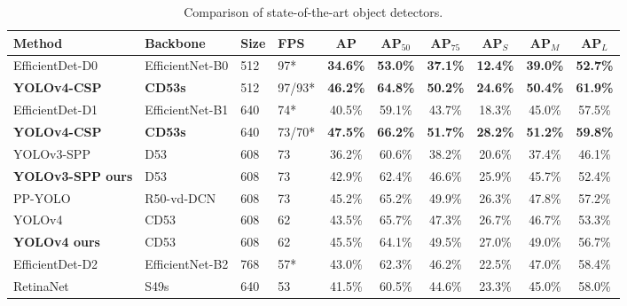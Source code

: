 \documentclass[10pt,twocolumn,letterpaper]{article}
\begin{document}
\begin{table*}[h]
\centering
\begin{threeparttable}[h]
	\footnotesize
	\caption{Comparison of state-of-the-art object detectors.}
	\label{table:t12}
\begin{tabular}{llllcccccc}
		\toprule
		\textbf{Method} & \textbf{Backbone} & \textbf{Size} & \textbf{FPS} & \textbf{AP} & \textbf{AP$_{50}$} & \textbf{AP$_{75}$} & \textbf{AP$_S$} & \textbf{AP$_M$} & \textbf{AP$_L$} \\	
		\midrule
		EfficientDet-D0 \cite{tan2019efficientdet} & EfficientNet-B0 \cite{tan2019efficientnet} & 512 & 97* & \textbf{34.6\%} & \textbf{53.0\%} & \textbf{37.1\%} & \textbf{12.4\%} & \textbf{39.0\%} & \textbf{52.7\%} \\
		\textbf{YOLOv4-CSP} & \textbf{CD53s} & 512 & 97/93* & \textbf{46.2\%} & \textbf{64.8\%} & \textbf{50.2\%} & \textbf{24.6\%} & \textbf{50.4\%} & \textbf{61.9\%} \\
		EfficientDet-D1 \cite{tan2019efficientdet} & EfficientNet-B1 \cite{tan2019efficientnet} & 640 & 74* & 40.5\% & 59.1\% & 43.7\% & 18.3\% & 45.0\% & 57.5\% \\
		\textbf{YOLOv4-CSP} & \textbf{CD53s} & 640 & 73/70* & \textbf{47.5\%} & \textbf{66.2\%} & \textbf{51.7\%} & \textbf{28.2\%} & \textbf{51.2\%} & \textbf{59.8\%} \\
		YOLOv3-SPP \cite{redmon2018yolov3} & D53 \cite{redmon2018yolov3} & 608 & 73 & 36.2\% & 60.6\% & 38.2\% & 20.6\% & 37.4\% & 46.1\% \\
		\textbf{YOLOv3-SPP ours} & D53 \cite{redmon2018yolov3} & 608 & 73 & 42.9\% & 62.4\% & 46.6\% & 25.9\% & 45.7\% & 52.4\% \\
		PP-YOLO \cite{long2020pp} & R50-vd-DCN \cite{long2020pp} & 608 & 73 & 45.2\% & 65.2\% & 49.9\% & 26.3\% & 47.8\% & 57.2\% \\
		YOLOv4 \cite{bochkovskiy2020yolov4} & CD53 \cite{bochkovskiy2020yolov4} & 608 & 62 & 43.5\% & 65.7\% & 47.3\% & 26.7\% & 46.7\% & 53.3\% \\
		\textbf{YOLOv4 ours} & CD53 \cite{bochkovskiy2020yolov4} & 608 & 62 & 45.5\% & 64.1\% & 49.5\% & 27.0\% & 49.0\% & 56.7\% \\
		\midrule
		EfficientDet-D2 \cite{tan2019efficientdet} & EfficientNet-B2 \cite{tan2019efficientnet} & 768 & 57* & 43.0\% & 62.3\% & 46.2\% & 22.5\% & 47.0\% & 58.4\% \\
		RetinaNet \cite{lin2017focal} & S49s \cite{du2019spinenet} & 640 & 53 & 41.5\% & 60.5\% & 44.6\% & 23.3\% & 45.0\% & 58.0\% \\

\end{tabular}
\end{threeparttable}
\end{table*}
\end{document}
